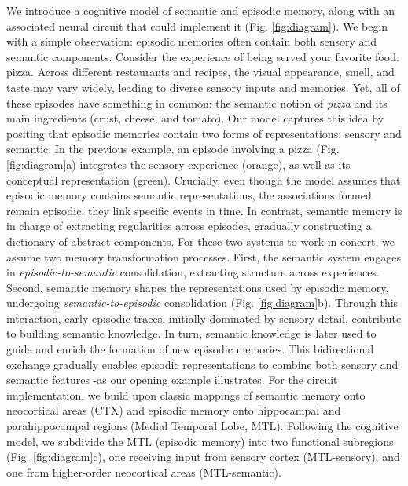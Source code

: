 \documentclass{article}
\begin{document}
\noindent We introduce a cognitive model of semantic and episodic memory, along with an associated neural circuit that could implement it (Fig. \ref{fig:diagram}). We begin with a simple observation: episodic memories often contain both sensory and semantic components. Consider the experience of being served your favorite food: pizza. Across different restaurants and recipes, the visual appearance, smell, and taste may vary widely, leading to diverse sensory inputs and memories. Yet, all of these episodes have something in common: the semantic notion of \textit{pizza} and its main ingredients (crust, cheese, and tomato).
\newline\newline
Our model captures this idea by positing that episodic memories contain two forms of representations: sensory and semantic. In the previous example, an episode involving a pizza (Fig. \ref{fig:diagram}a) integrates the sensory experience (orange), as well as its conceptual representation (green). 
Crucially, even though the model assumes that episodic memory contains semantic representations, the associations formed remain episodic: they link specific events in time.
\newline\newline
In contrast, semantic memory is in charge of extracting regularities across episodes, gradually constructing a dictionary of abstract components. For these two systems to work in concert, we assume two memory transformation processes. First, the semantic system engages in \textit{episodic-to-semantic} consolidation, extracting structure across experiences. Second, semantic memory shapes the representations used by episodic memory, undergoing \textit{semantic-to-episodic} consolidation (Fig. \ref{fig:diagram}b). Through this interaction, early episodic traces, initially dominated by sensory detail, contribute to building semantic knowledge. In turn, semantic knowledge is later used to guide and enrich the formation of new episodic memories. This bidirectional exchange gradually enables episodic representations to combine both sensory and semantic features -as our opening example illustrates.  
\newline\newline
For the circuit implementation, we build upon classic mappings of semantic memory onto neocortical areas (CTX) and episodic memory onto hippocampal and parahippocampal regions (Medial Temporal Lobe, MTL). Following the cognitive model, we subdivide the MTL (episodic memory) into two functional subregions (Fig. \ref{fig:diagram}c), one receiving input from sensory cortex (MTL-sensory), and one from higher-order neocortical areas (MTL-semantic). 
\end{document}
